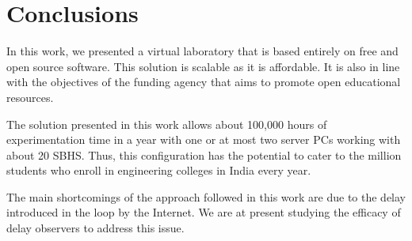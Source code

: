 \section{Conclusions}
In this work, we presented a virtual laboratory that is based entirely
on free and open source software.  This solution is scalable as it is
affordable.  It is also in line with the objectives of the funding
agency \cite{kmm010} that aims to promote open educational resources.

The solution presented in this work allows about 100,000 hours of
experimentation time in a year with one or at most two server PCs
working with about 20 SBHS.  Thus, this configuration has the
potential to cater to the million students who enroll in engineering
colleges in India every year.

The main shortcomings of the approach followed in this work are due to
the delay introduced in the loop by the Internet.  We are at present
studying the efficacy of delay observers \cite{kempf96,jones07} to
address this issue.




